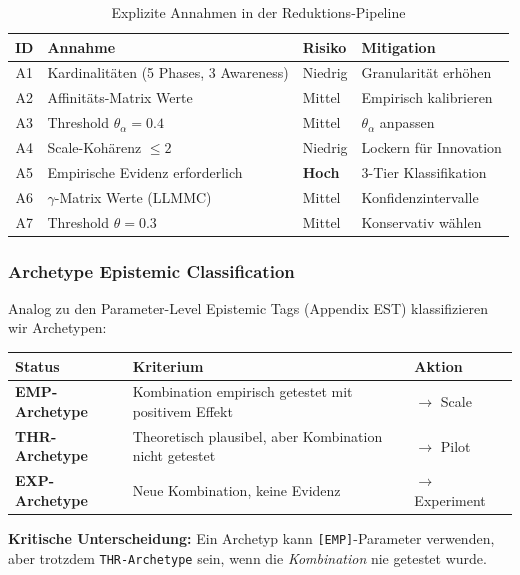 \begin{table}[htbp]
\centering
\caption{Explizite Annahmen in der Reduktions-Pipeline}
\label{tab:17-assumptions}
\renewcommand{\arraystretch}{1.3}
\small
\begin{tabular}{@{}clll@{}}
\toprule
\textbf{ID} & \textbf{Annahme} & \textbf{Risiko} & \textbf{Mitigation} \\
\midrule
A1 & Kardinalitäten (5 Phases, 3 Awareness) & Niedrig & Granularität erhöhen \\
A2 & Affinitäts-Matrix Werte & Mittel & Empirisch kalibrieren \\
A3 & Threshold $\theta_\alpha = 0.4$ & Mittel & $\theta_\alpha$ anpassen \\
A4 & Scale-Kohärenz $\leq 2$ & Niedrig & Lockern für Innovation \\
A5 & Empirische Evidenz erforderlich & \textbf{Hoch} & 3-Tier Klassifikation \\
A6 & $\gamma$-Matrix Werte (LLMMC) & Mittel & Konfidenzintervalle \\
A7 & Threshold $\theta = 0.3$ & Mittel & Konservativ wählen \\
\bottomrule
\end{tabular}
\end{table}

\subsubsection{Archetype Epistemic Classification}

\begin{tcolorbox}[colback=orange!5!white, colframe=orange!75!black,
    title=\textbf{Die Drei-Tier Archetype-Klassifikation}]

Analog zu den Parameter-Level Epistemic Tags (Appendix EST) klassifizieren wir Archetypen:

\begin{center}
\renewcommand{\arraystretch}{1.3}
\begin{tabular}{@{}lp{6cm}l@{}}
\toprule
\textbf{Status} & \textbf{Kriterium} & \textbf{Aktion} \\
\midrule
\cellcolor{green!20}\textbf{EMP-Archetype} & Kombination empirisch getestet mit positivem Effekt & $\rightarrow$ Scale \\
\cellcolor{blue!20}\textbf{THR-Archetype} & Theoretisch plausibel, aber Kombination nicht getestet & $\rightarrow$ Pilot \\
\cellcolor{orange!20}\textbf{EXP-Archetype} & Neue Kombination, keine Evidenz & $\rightarrow$ Experiment \\
\bottomrule
\end{tabular}
\end{center}

\textbf{Kritische Unterscheidung:} Ein Archetyp kann \texttt{[EMP]}-Parameter verwenden, aber trotzdem \texttt{THR-Archetype} sein, wenn die \textit{Kombination} nie getestet wurde.

\end{tcolorbox}

